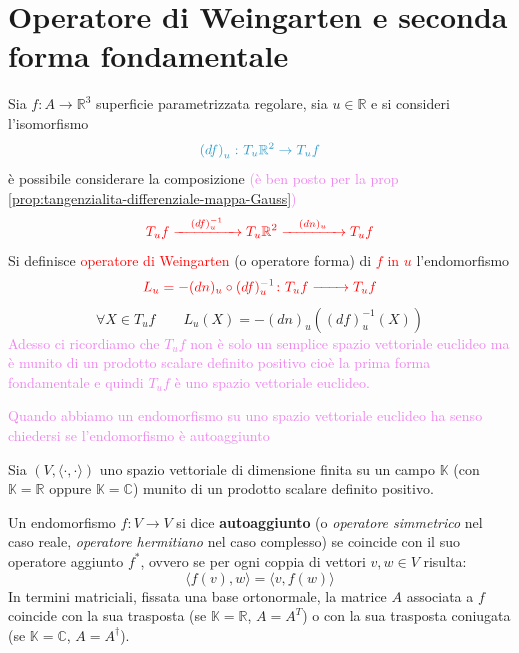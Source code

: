    \section{Operatore di Weingarten e seconda forma fondamentale}
        \begin{definizione}
        Sia $f \colon A \to \mathbb{R}^3$ superficie parametrizzata regolare, sia $u \in \mathbb{R}$ e si consideri l'isomorfismo 
        \[ \color{celeste} \left(df\right)_u \colon T_u \mathbb{R}^2 \to T_u f \]
        è possibile considerare la composizione \textcolor{violet}{(è ben posto per la prop \ref{prop:tangenzialita-differenziale-mappa-Gauss})}
        \[ \color{red} T_u f \xrightarrow{\quad  (df)_u^{-1} \quad}  T_u \mathbb{R}^2 \xrightarrow{\quad (dn)_u \quad} T_u f \]
        Si definisce \textcolor{red}{operatore di Weingarten} (o operatore forma) di \textcolor{red}{$f$ in $u$} l'endomorfismo 
        \begin{equation}
        \label{eq:definizione_operatore_di_Weingarten}
        \color{red} L_u = - (dn)_u \circ (df)_u^{-1} \colon T_u f \xrightarrow{\qquad} T_u f
        \end{equation}
        \[ \forall X \in T_u f \qquad L_u(X) = - (dn)_u \left( (df)_u^{-1} (X) \right) \]
        \textcolor{violet}{Adesso ci ricordiamo che $T_u f$ non è solo un semplice spazio vettoriale euclideo ma è munito di un prodotto
        scalare definito positivo cioè la prima forma fondamentale e quindi $T_u f$ è uno spazio vettoriale euclideo. }

        \textcolor{violet}{Quando abbiamo un endomorfismo su uno spazio vettoriale euclideo ha senso chiedersi se l'endomorfismo è autoaggiunto}
        \end{definizione}
        \begin{richiamo}
        \mbox{}

        Sia $(V, \langle \cdot, \cdot \rangle)$ uno spazio vettoriale di dimensione finita su un campo $\mathbb{K}$ (con $\mathbb{K} = \mathbb{R}$ oppure $\mathbb{K} = \mathbb{C}$) munito di un prodotto scalare definito positivo. 

        Un endomorfismo $f: V \to V$ si dice \textbf{autoaggiunto} (o \emph{operatore simmetrico} nel caso reale, \emph{operatore hermitiano} nel caso complesso) se coincide con il suo operatore aggiunto $f^*$, ovvero se per ogni coppia di vettori $v, w \in V$ risulta:
        \[
        \langle f(v), w \rangle = \langle v, f(w) \rangle
        \]
        In termini matriciali, fissata una base ortonormale, la matrice $A$ associata a $f$ coincide con la sua trasposta (se $\mathbb{K} = \mathbb{R}$, $A = A^T$) o con la sua trasposta coniugata (se $\mathbb{K} = \mathbb{C}$, $A = A^\dagger$).
        \end{richiamo}
